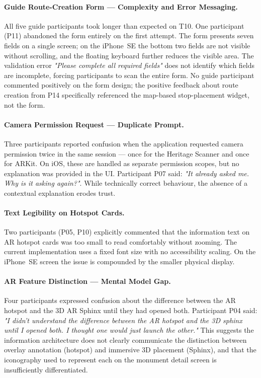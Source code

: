 \paragraph{Guide Route-Creation Form — Complexity and Error Messaging.}
All five guide participants took longer than expected on T10. One participant (P11)
abandoned the form entirely on the first attempt. The form presents seven fields on a
single screen; on the iPhone~SE the bottom two fields are not visible without scrolling,
and the floating keyboard further reduces the visible area. The validation error
\textit{"Please complete all required fields"} does not identify which fields are
incomplete, forcing participants to scan the entire form. No guide participant
commented positively on the form design; the positive feedback about route creation
from P14 specifically referenced the map-based stop-placement widget, not the form.

\paragraph{Camera Permission Request — Duplicate Prompt.}
Three participants reported confusion when the application requested camera permission
twice in the same session — once for the Heritage Scanner and once for ARKit. On iOS,
these are handled as separate permission scopes, but no explanation was provided in the
UI. Participant P07 said: \textit{"It already asked me. Why is it asking again?"}. While
technically correct behaviour, the absence of a contextual explanation erodes trust.

\paragraph{Text Legibility on Hotspot Cards.}
Two participants (P05, P10) explicitly commented that the information text on AR hotspot
cards was too small to read comfortably without zooming. The current implementation uses
a fixed font size with no accessibility scaling. On the iPhone~SE screen the issue is
compounded by the smaller physical display.

\paragraph{AR Feature Distinction — Mental Model Gap.}
Four participants expressed confusion about the difference between the AR hotspot and
the 3D AR Sphinx until they had opened both. Participant P04 said: \textit{"I didn't
understand the difference between the AR hotspot and the 3D sphinx until I opened both.
I thought one would just launch the other."} This suggests the information architecture
does not clearly communicate the distinction between overlay annotation (hotspot) and
immersive 3D placement (Sphinx), and that the iconography used to represent each on the
monument detail screen is insufficiently differentiated.

